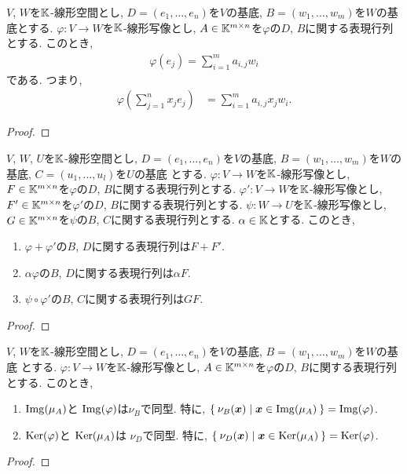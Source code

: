 \begin{prop}
  $V$, $W$を$\mathbb{K}$-線形空間とし,
  $D=(e_1,\ldots,e_n)$を$V$の基底,
  $B=(w_1,\ldots,w_m)$を$W$の基底とする.
  $\varphi\colon V\to W$を$\mathbb{K}$-線形写像とし,
  $A\in\mathbb{K}^{m\times n}$を$\varphi$の$D$, $B$に関する表現行列とする.
このとき,
\begin{align*}
  \varphi(e_j)=\sum_{i=1}^m a_{i,j}w_i
\end{align*}
である.
つまり,
\begin{align*}
  \varphi(\sum_{j=1}^n x_j e_j)
  &=\sum_{i=1}^m a_{i,j}x_jw_i.
\end{align*}
\end{prop}
\begin{proof}\end{proof}


\begin{prop}
  $V$, $W$, $U$を$\mathbb{K}$-線形空間とし,
  $D=(e_1,\ldots,e_n)$を$V$の基底,
  $B=(w_1,\ldots,w_m)$を$W$の基底,
  $C=(u_1,\ldots,u_l)$を$U$の基底
  とする.
  $\varphi\colon V\to W$を$\mathbb{K}$-線形写像とし,
  $F\in\mathbb{K}^{m\times n}$を$\varphi$の$D$, $B$に関する表現行列とする.
  $\varphi'\colon V\to W$を$\mathbb{K}$-線形写像とし,
  $F'\in\mathbb{K}^{m\times n}$を$\varphi'$の$D$, $B$に関する表現行列とする.
  $\psi\colon W\to U$を$\mathbb{K}$-線形写像とし,
  $G\in\mathbb{K}^{m\times n}$を$\psi$の$B$, $C$に関する表現行列とする.
  $\alpha\in \mathbb{K}$とする.
このとき,
\begin{enumerate}
  \item $\varphi+\varphi'$の$B$, $D$に関する表現行列は$F+F'$.
  \item $\alpha\varphi$の$B$, $D$に関する表現行列は$\alpha F$.
  \item $\psi\circ\varphi'$の$B$, $C$に関する表現行列は$GF$.
\end{enumerate}
\end{prop}
\begin{proof}\end{proof}



\begin{prop}
  $V$, $W$を$\mathbb{K}$-線形空間とし,
  $D=(e_1,\ldots,e_n)$を$V$の基底,
  $B=(w_1,\ldots,w_m)$を$W$の基底
  とする.
  $\varphi\colon V\to W$を$\mathbb{K}$-線形写像とし,
  $A\in\mathbb{K}^{m\times n}$を$\varphi$の$D$, $B$に関する表現行列とする.
  このとき,
\begin{enumerate}
  \item
  $\operatorname{Img}(\mu_A)$と
  $\operatorname{Img}(\varphi)$は$\nu_B$で同型.
  特に,
  $\Set{\nu_B(\boldsymbol{x}) |\boldsymbol{x}\in \operatorname{Img}(\mu_A)}=\operatorname{Img}(\varphi)$.
  \item
  $\operatorname{Ker}(\varphi)$と
  $\operatorname{Ker}(\mu_A)$は
  $\nu_D$で同型.
  特に,
  $\Set{\nu_D(\boldsymbol{x}) |\boldsymbol{x}\in \operatorname{Ker}(\mu_A)}=\operatorname{Ker}(\varphi)$.
\end{enumerate}
\end{prop}
\begin{proof}\end{proof}

